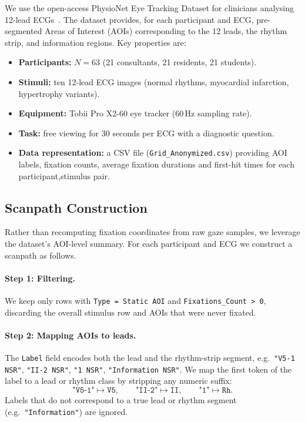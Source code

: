 \documentclass[sigconf]{acmart}
\theoremstyle{plain}
\theoremstyle{definition}
\begin{document}
We use the open-access PhysioNet Eye Tracking Dataset for clinicians analysing 12-lead ECGs~\cite{sqalli2022}.
The dataset provides, for each participant and ECG, pre-segmented Areas of Interest (AOIs) corresponding to the 12 leads, the rhythm strip, and information regions.
Key properties are:
\begin{itemize}
    \item \textbf{Participants:} $N=63$ (21 consultants, 21 residents, 21 students).
    \item \textbf{Stimuli:} ten 12-lead ECG images (normal rhythms, myocardial infarction, hypertrophy variants).
    \item \textbf{Equipment:} Tobii Pro X2-60 eye tracker (60\,Hz sampling rate).
    \item \textbf{Task:} free viewing for 30 seconds per ECG with a diagnostic question.
    \item \textbf{Data representation:} a CSV file (\texttt{Grid\_Anonymized.csv}) providing AOI labels, fixation counts, average fixation durations and first-hit times for each participant,stimulus pair.
\end{itemize}

\subsection{Scanpath Construction}

Rather than recomputing fixation coordinates from raw gaze samples, we leverage the dataset's AOI-level summary.
For each participant and ECG we construct a scanpath as follows.

\paragraph{Step 1: Filtering.}
We keep only rows with \texttt{Type = Static AOI} and \texttt{Fixations\_Count > 0}, discarding the overall stimulus row and AOIs that were never fixated.

\paragraph{Step 2: Mapping AOIs to leads.}
The \texttt{Label} field encodes both the lead and the rhythm-strip segment, e.g.\ \texttt{"V5-1 NSR"}, \texttt{"II-2 NSR"}, \texttt{"1 NSR"}, \texttt{"Information NSR"}.
We map the first token of the label to a lead or rhythm class by stripping any numeric suffix:
\[
\texttt{"V5-1"} \mapsto \texttt{V5}, \qquad
\texttt{"II-2"} \mapsto \texttt{II}, \qquad
\texttt{"1"} \mapsto \texttt{Rh}.
\]
Labels that do not correspond to a true lead or rhythm segment (e.g.\ \texttt{"Information"}) are ignored.
\end{document}
